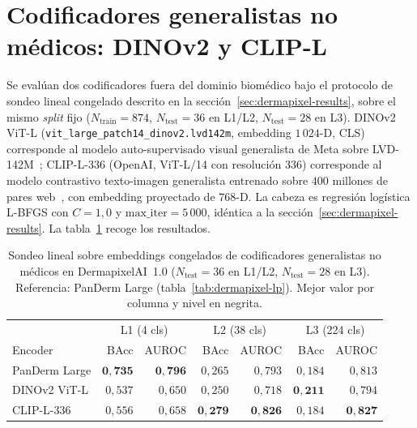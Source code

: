 \section{Codificadores generalistas no médicos: DINOv2 y CLIP-L}
\label{sec:dermapixel-extra-encoders}

Se evalúan dos codificadores fuera del dominio biomédico bajo el
protocolo de sondeo lineal congelado descrito en la
sección~\ref{sec:dermapixel-results}, sobre el mismo
\emph{split} fijo ($N_{\mathrm{train}} = 874$,
$N_{\mathrm{test}} = 36$ en L1/L2, $N_{\mathrm{test}} = 28$ en
L3). DINOv2 ViT-L (\texttt{vit\_large\_patch14\_dinov2.lvd142m},
embedding $1\,024$-D, CLS) corresponde al modelo auto-supervisado
visual generalista de Meta sobre LVD-142M~\cite{dinov2}; CLIP-L-336
(OpenAI, ViT-L/14 con resolución $336$) corresponde al modelo
contrastivo texto-imagen generalista entrenado sobre $400$
millones de pares web~\cite{clip2021}, con embedding proyectado de
$768$-D. La cabeza es regresión logística L-BFGS con $C = 1{,}0$ y
$\mathrm{max\_iter} = 5\,000$, idéntica a la
sección~\ref{sec:dermapixel-results}. La
tabla~\ref{tab:dermapixel-extra-encoders} recoge los resultados.

\begin{table}[H]
\centering
\footnotesize
\setlength{\tabcolsep}{4pt}
\renewcommand{\arraystretch}{0.95}
\caption{Sondeo lineal sobre embeddings congelados de
codificadores generalistas no médicos en DermapixelAI~1.0
($N_{\mathrm{test}} = 36$ en L1/L2, $N_{\mathrm{test}} = 28$ en
L3). Referencia: PanDerm Large
(tabla~\ref{tab:dermapixel-lp}). Mejor valor por columna y nivel en
negrita.}
\label{tab:dermapixel-extra-encoders}
\begin{tabular}{lrrrrrr}
\hline
              & \multicolumn{2}{c}{L1 (4 cls)} & \multicolumn{2}{c}{L2 (38 cls)} & \multicolumn{2}{c}{L3 (224 cls)} \\
Encoder       & BAcc & AUROC & BAcc & AUROC & BAcc & AUROC \\
\hline
PanDerm Large & $\mathbf{0{,}735}$ & $\mathbf{0{,}796}$
              & $0{,}265$          & $0{,}793$
              & $0{,}184$          & $0{,}813$ \\
DINOv2 ViT-L  & $0{,}537$          & $0{,}650$
              & $0{,}250$          & $0{,}718$
              & $\mathbf{0{,}211}$ & $0{,}794$ \\
CLIP-L-336    & $0{,}556$          & $0{,}658$
              & $\mathbf{0{,}279}$ & $\mathbf{0{,}826}$
              & $0{,}184$          & $\mathbf{0{,}827}$ \\
\hline
\end{tabular}
\end{table}

